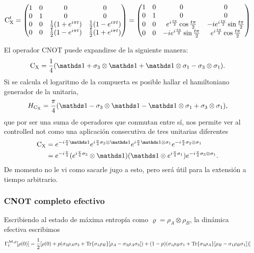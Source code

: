 \begin{equation}\label{eq:CNOT(t)}
\text{C}_{\text{X}}^{t}=\begin{pmatrix}
 1 & 0 & 0 & 0 \\
 0 & 1 & 0 & 0 \\
 0 & 0 & \frac{1}{2}(1+e^{i \pi t}) & \frac{1}{2} (1-e^{i \pi t}) \\
 0 & 0 & \frac{1}{2}(1-e^{i \pi t}) & \frac{1}{2}(1+e^{i \pi t})
\end{pmatrix}=\begin{pmatrix}
  1 & 0 & 0 & 0 \\
  0 & 1 & 0 & 0 \\
  0 & 0 & e^{i\frac{t\pi}{2}}\cos{\frac{t\pi}{2}} & -ie^{i\frac{t\pi}{2}}\sin{\frac{t\pi}{2}}\\
  0 & 0 & -ie^{i\frac{t\pi}{2}}\sin{\frac{t\pi}{2}} & e^{i\frac{t\pi}{2}}\cos{\frac{t\pi}{2}}
 \end{pmatrix}
\end{equation}

El operador \textsc{CNOT} puede expandirse de la siguiente manera:
\begin{equation*}
        \cnot=\frac{1}{4}(\Id+\pauli{3}\otimes\Id+\Id\otimes\pauli{1}-\pauli{3}\otimes\pauli{1}).
\end{equation*}
Si se calcula el logaritmo de la compuerta es posible hallar el hamiltoniano generador de la unitaria,
\begin{equation*}
    H_{\cnot}=\frac{\pi}{4}\qty(\Id-\pauli{3}\otimes\Id-\Id\otimes\pauli{1}+\pauli{3}\otimes\pauli{1}),
\end{equation*}
que por ser una suma de operadores que conmutan entre sí, nos permite ver al controlled not como una aplicación consecutiva de tres unitarias diferentes
\begin{align*}
    \cnot&=e^{-i\frac{\pi}{4}\Id}e^{i\frac{\pi}{4}\pauli{3}\otimes\Id}e^{i\frac{\pi}{4}\Id\otimes\pauli{1}}e^{-i\frac{\pi}{4}\pauli{3}\otimes\pauli{1}}\\
    &=e^{-i\frac{\pi}{4}} (e^{i\frac{\pi}{4}\pauli{3}}\otimes \Id) (\Id \otimes e^{i\frac{\pi}{4}\pauli{1}}) e^{-i\frac{\pi}{4}\pauli{3}\otimes\pauli{1}}.
\end{align*}
De momento no le vi como sacarle jugo a esto, pero será útil para la extensión a tiempo arbitrario.


\subsubsection{CNOT completo efectivo}
Escribiendo al estado de máxima entropía como $\varrho=\rho_{A}\otimes\rho_{B}$, la dinámica efectiva escribimos
\begin{equation*}
    \Gamma_{t}^{\mathcal{M},\rho}[\rho(0)]=\frac{1}{2}[\rho(0)+p(\sigma_{3}\rho_{A}\sigma_{3}+\Tr{\sigma_{1}\rho_{B}}[\rho_{A}-\sigma_{3}\rho_{A}\sigma_{3}])+(1-p)(\sigma_{1}\rho_{B}\sigma_{1}+\Tr{\sigma_{3}\rho_{A}}[\rho_{B}-\sigma_{1}\rho_{B}\sigma_{1}])]
\end{equation*}

